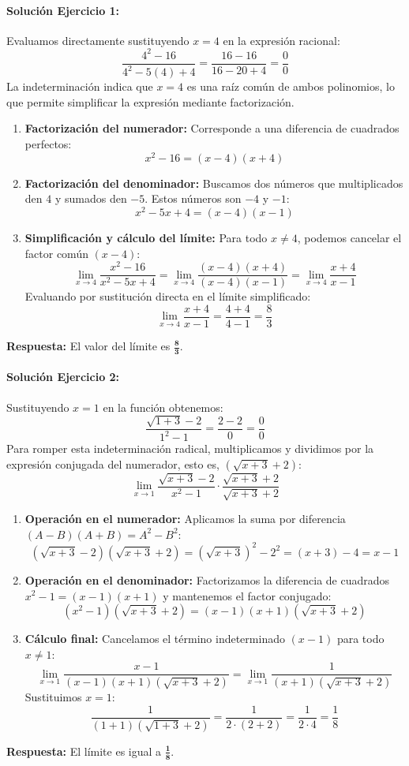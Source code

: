 \documentclass[11pt,letterpaper]{article}
\begin{document}
\paragraph{Solución Ejercicio 1:}
Evaluamos directamente sustituyendo $x = 4$ en la expresión racional:
$$\frac{4^2 - 16}{4^2 - 5(4) + 4} = \frac{16 - 16}{16 - 20 + 4} = \frac{0}{0}$$
La indeterminación indica que $x = 4$ es una raíz común de ambos polinomios, lo que permite simplificar la expresión mediante factorización.
\begin{enumerate}
    \item \textbf{Factorización del numerador:} Corresponde a una diferencia de cuadrados perfectos:
    $$x^2 - 16 = (x - 4)(x + 4)$$
    \item \textbf{Factorización del denominador:} Buscamos dos números que multiplicados den $4$ y sumados den $-5$. Estos números son $-4$ y $-1$:
    $$x^2 - 5x + 4 = (x - 4)(x - 1)$$
    \item \textbf{Simplificación y cálculo del límite:} Para todo $x \neq 4$, podemos cancelar el factor común $(x - 4)$:
    $$\lim_{x\to 4} \frac{x^2 - 16}{x^2 - 5x + 4} = \lim_{x\to 4} \frac{(x - 4)(x + 4)}{(x - 4)(x - 1)} = \lim_{x\to 4} \frac{x + 4}{x - 1}$$
    Evaluando por sustitución directa en el límite simplificado:
    $$\lim_{x\to 4} \frac{x + 4}{x - 1} = \frac{4 + 4}{4 - 1} = \frac{8}{3}$$
\end{enumerate}
\textbf{Respuesta:} El valor del límite es $\mathbf{\frac{8}{3}}$.

\paragraph{Solución Ejercicio 2:}
Sustituyendo $x = 1$ en la función obtenemos:
$$\frac{\sqrt{1+3} - 2}{1^2 - 1} = \frac{2 - 2}{0} = \frac{0}{0}$$
Para romper esta indeterminación radical, multiplicamos y dividimos por la expresión conjugada del numerador, esto es, $(\sqrt{x+3} + 2)$:
$$\lim_{x\to 1} \frac{\sqrt{x+3} - 2}{x^2 - 1} \cdot \frac{\sqrt{x+3} + 2}{\sqrt{x+3} + 2}$$
\begin{enumerate}
    \item \textbf{Operación en el numerador:} Aplicamos la suma por diferencia $(A-B)(A+B) = A^2 - B^2$:
    $$(\sqrt{x+3} - 2)(\sqrt{x+3} + 2) = (\sqrt{x+3})^2 - 2^2 = (x + 3) - 4 = x - 1$$
    \item \textbf{Operación en el denominador:} Factorizamos la diferencia de cuadrados $x^2 - 1 = (x - 1)(x + 1)$ y mantenemos el factor conjugado:
    $$(x^2 - 1)(\sqrt{x+3} + 2) = (x - 1)(x + 1)(\sqrt{x+3} + 2)$$
    \item \textbf{Cálculo final:} Cancelamos el término indeterminado $(x-1)$ para todo $x \neq 1$:
    $$\lim_{x\to 1} \frac{x - 1}{(x - 1)(x + 1)(\sqrt{x+3} + 2)} = \lim_{x\to 1} \frac{1}{(x + 1)(\sqrt{x+3} + 2)}$$
    Sustituimos $x = 1$:
    $$\frac{1}{(1 + 1)(\sqrt{1+3} + 2)} = \frac{1}{2 \cdot (2 + 2)} = \frac{1}{2 \cdot 4} = \frac{1}{8}$$
\end{enumerate}
\textbf{Respuesta:} El límite es igual a $\mathbf{\frac{1}{8}}$.
\end{document}

